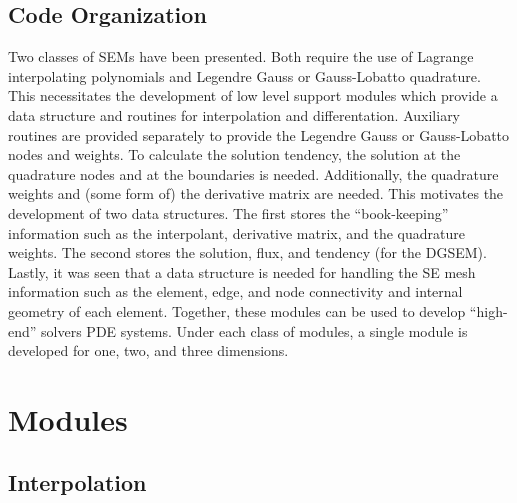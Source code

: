 \documentclass[12pt]{softwaremanual}
\begin{document}
\section{Code Organization}
Two classes of SEMs have been presented. Both require the use of Lagrange interpolating polynomials and Legendre Gauss or Gauss-Lobatto quadrature. This necessitates the development of low level support modules which provide a data structure and routines for interpolation and differentation. Auxiliary routines are provided separately to provide the Legendre Gauss or Gauss-Lobatto nodes and weights. To calculate the solution tendency, the solution at the quadrature nodes and at the boundaries is needed. Additionally, the quadrature weights and (some form of) the derivative matrix are needed. This motivates the development of two data structures. The first stores the ``book-keeping'' information such as the interpolant, derivative matrix, and the quadrature weights. The second stores the solution, flux, and tendency (for the DGSEM). Lastly, it was seen that a data structure is needed for handling the SE mesh information such as the element, edge, and node connectivity and internal geometry of each element. Together, these modules can be used to develop ``high-end'' solvers PDE systems. Under each class of modules, a single module is developed for one, two, and three dimensions.


\chapter{Modules}
\section{Interpolation}
\end{document}
